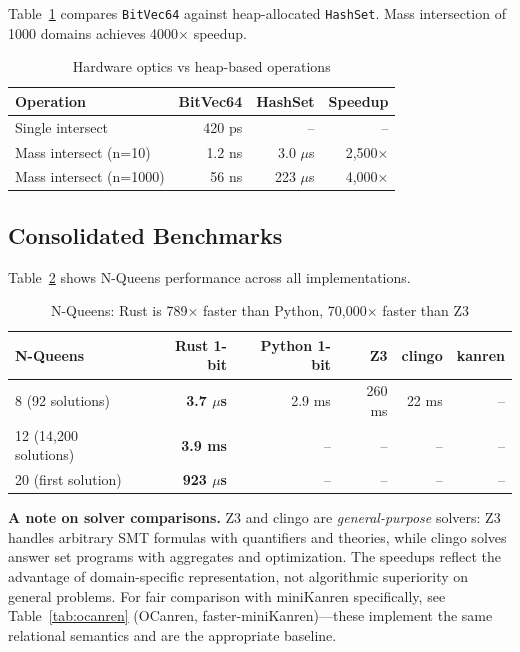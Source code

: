 \documentclass[11pt,a4paper]{article}
\begin{document}
Table~\ref{tab:micro} compares \texttt{BitVec64} against heap-allocated \texttt{HashSet}. Mass intersection of 1000 domains achieves 4000$\times$ speedup.

\begin{table}[H]
\centering
\begin{tabular}{lrrr}
\toprule
\textbf{Operation} & \textbf{BitVec64} & \textbf{HashSet} & \textbf{Speedup} \\
\midrule
Single intersect & 420 ps & -- & -- \\
Mass intersect (n=10) & 1.2 ns & 3.0 $\mu$s & 2,500$\times$ \\
Mass intersect (n=1000) & 56 ns & 223 $\mu$s & 4,000$\times$ \\
\bottomrule
\end{tabular}
\caption{Hardware optics vs heap-based operations}
\label{tab:micro}
\end{table}

\subsection{Consolidated Benchmarks}

Table~\ref{tab:nqueens} shows N-Queens performance across all implementations.

\begin{table}[H]
\centering
\begin{tabular}{lrrrrr}
\toprule
\textbf{N-Queens} & \textbf{Rust 1-bit} & \textbf{Python 1-bit} & \textbf{Z3} & \textbf{clingo} & \textbf{kanren} \\
\midrule
8 (92 solutions) & \textbf{3.7 $\mu$s} & 2.9 ms & 260 ms & 22 ms & -- \\
12 (14,200 solutions) & \textbf{3.9 ms} & -- & -- & -- & -- \\
20 (first solution) & \textbf{923 $\mu$s} & -- & -- & -- & -- \\
\bottomrule
\end{tabular}
\caption{N-Queens: Rust is 789$\times$ faster than Python, 70,000$\times$ faster than Z3}
\label{tab:nqueens}
\end{table}

\textbf{A note on solver comparisons.}
Z3 and clingo are \emph{general-purpose} solvers: Z3 handles arbitrary SMT formulas with quantifiers and theories, while clingo solves answer set programs with aggregates and optimization.
The speedups reflect the advantage of domain-specific representation, not algorithmic superiority on general problems.
For fair comparison with miniKanren specifically, see Table~\ref{tab:ocanren} (OCanren, faster-miniKanren)---these implement the same relational semantics and are the appropriate baseline.
\end{document}
